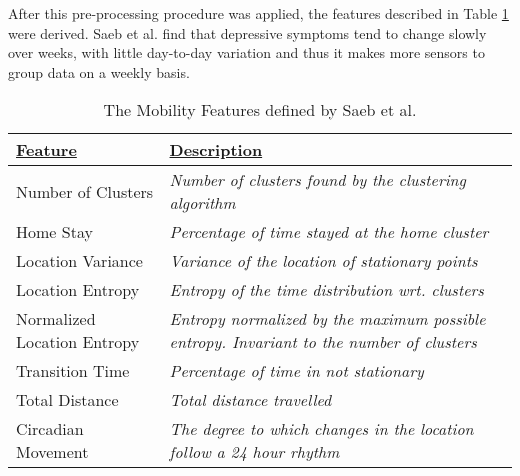 After this pre-processing procedure was applied, the features described in Table \ref{tab:saeb-features} were derived.
Saeb et al. find that depressive symptoms tend to change slowly over weeks, with little day-to-day variation and thus it makes more sensors to group data on a weekly basis.

\begin{table}[h]
    \centering
\begin{tabular}{|p{}|p{}|}
\hline
{\ul \textbf{Feature}}      & {\ul \textbf{Description}}                                                                                                                     \\ \hline
Number of Clusters          & \textit{Number of clusters found by the clustering algorithm}                                       \\ \hline
Home Stay                   & \textit{Percentage of time stayed at the home cluster}                                              \\ \hline
Location Variance           & \textit{Variance of the location of stationary points}                                              \\ \hline
Location Entropy            & \textit{Entropy of the time distribution wrt. clusters}                                             \\ \hline
Normalized Location Entropy & \textit{Entropy normalized by the maximum possible entropy. Invariant to the number of clusters} \\ \hline
Transition Time             & \textit{Percentage of time in not stationary}                                                                                                  \\ \hline
Total Distance              & \textit{Total distance travelled}                                                                                                              \\ \hline
Circadian Movement          & \textit{The degree to which changes in the location follow a 24 hour rhythm}                        \\ \hline
\end{tabular}
    \caption{The Mobility Features defined by Saeb et al. \cite{Saeb2015}}
    \label{tab:saeb-features}
\end{table}





